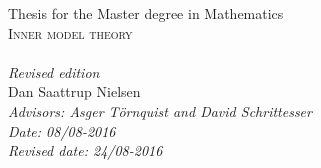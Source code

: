 \begin{titlepage}
	\vspace*{7.0cm}
	{\Large Thesis for the Master degree in Mathematics}\\[0.7cm]
	{\Huge\textsc{Inner model theory}}\\[0.3cm]
        \hspace*{0.3cm}{\LARGE -- an introduction}\\[0.4cm]
        {\Large\textit{Revised edition}}\\[1.0cm]
	{\Large Dan Saattrup Nielsen}\\[5.5cm]
	{\large\textit{Advisors: Asger Törnquist and David Schrittesser}}\\[0.4cm]
	{\large\textit{Date: 08/08-2016}}\\
        {\large\textit{Revised date: 24/08-2016}}
	\vspace*{\fill}
\end{titlepage}

\noindent
\pagestyle{fancy}
\fancyhead[LO]{\nouppercase\leftmark}
\fancyfoot{}
\setlength\headsep{35pt}

\thispagestyle{empty}
